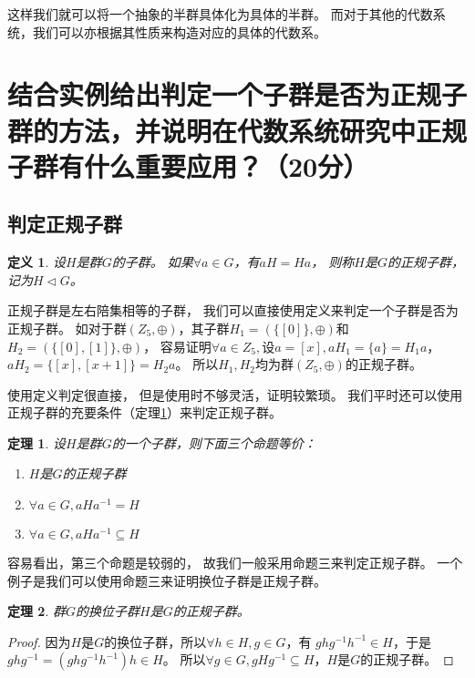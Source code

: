 \documentclass[12pt,onecolumn]{article}
\newtheorem*{proof}{证明}
\theoremstyle{plain}
\newtheorem{definition}{定义}[section]
\newtheorem{theorem}{定理}[section]
\begin{document}
这样我们就可以将一个抽象的半群具体化为具体的半群。
而对于其他的代数系统，我们可以亦根据其性质来构造对应的具体的代数系。

\section{结合实例给出判定一个子群是否为正规子群的方法，并说明在代数系统研究中正规子群有什么重要应用？（20分）}

\subsection{判定正规子群}

\begin{definition}
 设$H$是群$G$的子群。
 如果$\forall a \in G$，有$aH = Ha$，
 则称$H$是$G$的正规子群，
 记为$H \triangleleft G$。
\end{definition}

正规子群是左右陪集相等的子群，
我们可以直接使用定义来判定一个子群是否为正规子群。
如对于群$(Z_5, \oplus)$，其子群$H_1 = (\{[0]\}, \oplus)$和$H_2 = (\{[0], [1]\}, \oplus)$，
容易证明$\forall a \in Z_5, \text{设}a = [x], aH_1 = \{a\} = H_1a$，
$aH_2 = \{[x], [x + 1]\} = H_2a$。
所以$H_1, H_2$均为群$(Z_5, \oplus)$的正规子群。

使用定义判定很直接，
但是使用时不够灵活，证明较繁琐。
我们平时还可以使用正规子群的充要条件（定理\ref{theo:normal_subgroup}）来判定正规子群。

\begin{theorem}
 \label{theo:normal_subgroup}
 设$H$是群$G$的一个子群，则下面三个命题等价：
 \begin{enumerate}[fullwidth,itemindent=\parindent,label=（\arabic*）]
 \item $H$是$G$的正规子群
 \item $\forall a \in G, aHa^{-1} = H$
 \item $\forall a \in G, aHa^{-1} \subseteq H$
 \end{enumerate}
\end{theorem}

容易看出，第三个命题是较弱的，
故我们一般采用命题三来判定正规子群。
一个例子是我们可以使用命题三来证明换位子群是正规子群。

\begin{theorem}
 群$G$的换位子群$H$是$G$的正规子群。
\end{theorem}
\begin{proof}
 因为$H$是$G$的换位子群，所以$\forall h \in H, g \in G$，有
 $ghg^{-1}h^{-1} \in H$，于是$ghg^{-1} = (ghg^{-1}h^{-1})h \in H$。
 所以$\forall g \in G, gHg^{-1} \subseteq H$，$H$是$G$的正规子群。
\end{proof}
\end{document}

